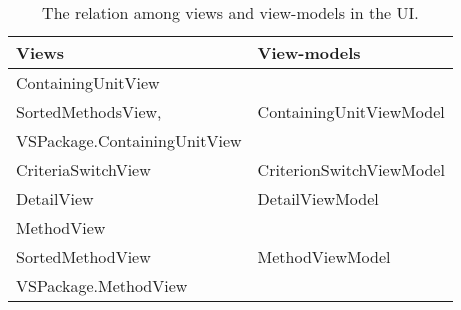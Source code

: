\begin{table}
    \begin{tabular}{|l|l|}
        \hline
        \textbf{Views}                                                               & \textbf{View-models }             \\ \hline
        ContainingUnitView 													&       				   \\ 
        SortedMethodsView, 													& ContainingUnitViewModel  \\ 
        VSPackage.ContainingUnitView 										&   					   \\ \hline
        CriteriaSwitchView                                                  & CriterionSwitchViewModel \\ \hline
        DetailView                                                          & DetailViewModel          \\ \hline
        MethodView										                    &                          \\
        SortedMethodView								                    & MethodViewModel          \\
        VSPackage.MethodView                                                &                          \\ \hline
    \end{tabular}
    	\label{tab:05view-view-models}
    	\caption{The relation among views and view-models in the UI.}
\end{table}






















